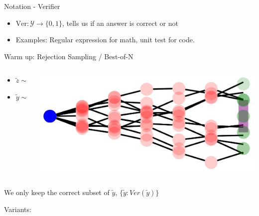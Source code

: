 \documentclass[14pt,aspectratio=169]{beamer}
\begin{document}
\begin{frame}{Notation - Verifier}
	\begin{itemize}
		\item $\text{Ver} : \mathcal{Y} \rightarrow \{0, 1\}$, tells us if an answer is correct or not
		\item Examples: Regular expression for math, unit test for code.
	\end{itemize}
\end{frame}


\begin{frame}{Warm up: Rejection Sampling / Best-of-N}
	\begin{columns}
		\begin{column}{0.5\linewidth}
			\begin{itemize}
				\item $\tilde{z} \sim p(z | x)$
				\item $\tilde{y} \sim p(y | x, \tilde{z})$
			\end{itemize}
		\end{column}
		\begin{column}{0.5\linewidth}
			\includegraphics[width=\textwidth]{images/reject.png}
		\end{column}
	\end{columns}
    \vspace{1cm}
    We only keep the correct subset of $\tilde{y}$, $\{\tilde{y} : Ver(\tilde{y}) \}$\end{frame}

\begin{frame}{Variants:}
\end{frame}
\end{document}
